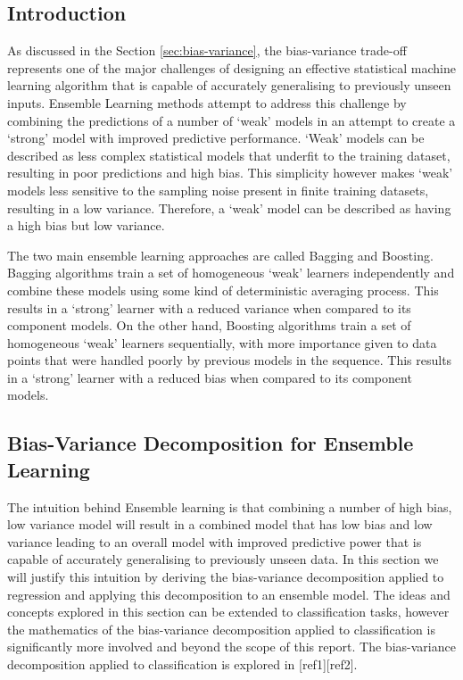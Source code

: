 \documentclass[../SMLreport_template.tex]{subfiles}
\begin{document}
\subsection{Introduction}
As discussed in the Section \ref{sec:bias-variance}, the bias-variance trade-off represents one of the major challenges of designing an effective statistical machine learning algorithm that is capable of accurately generalising to previously unseen inputs. Ensemble Learning methods attempt to address this challenge by combining the predictions of a number of ‘weak’ models in an attempt to create a ‘strong’ model with improved predictive performance. ‘Weak’ models can be described as less complex statistical models that underfit to the training dataset, resulting in poor predictions and high bias. This simplicity however makes ‘weak’ models less sensitive to the sampling noise present in finite training datasets, resulting in a low variance. Therefore, a ‘weak’ model can be described as having a high bias but low variance. \par\noindent
The two main ensemble learning approaches are called Bagging and Boosting. Bagging algorithms train a set of homogeneous ‘weak’ learners independently and combine these models using some kind of deterministic averaging process. This results in a ‘strong’ learner with a reduced variance when compared to its component models.  On the other hand, Boosting algorithms train a set of homogeneous ‘weak’ learners sequentially, with more importance given to data points that were handled poorly by previous models in the sequence. This results in a ‘strong’ learner with a reduced bias when compared to its component models.

\subsection{Bias-Variance Decomposition for Ensemble Learning}
The intuition behind Ensemble learning is that combining a number of high bias, low variance model will result in a combined model that has low bias and low variance leading to an overall model with improved predictive power that is capable of accurately generalising to previously unseen data. In this section we will justify this intuition by deriving the bias-variance decomposition applied to regression and applying this decomposition to an ensemble model. The ideas and concepts explored in this section can be extended to classification tasks, however the mathematics of the bias-variance decomposition applied to classification is significantly more involved and beyond the scope of this report. The bias-variance decomposition applied to classification is explored in [ref1][ref2].
\end{document}
